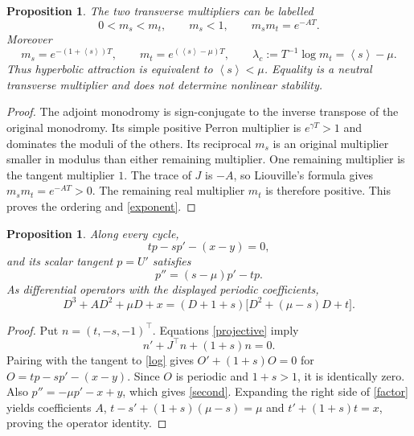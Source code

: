 \documentclass[11pt,a4paper]{article}
\newtheorem{proposition}[theorem]{Proposition}\newtheorem{corollary}[theorem]{Corollary}
\theoremstyle{remark}\newtheorem{remark}[theorem]{Remark}
\newcommand{\av}[1]{\left\langle #1\right\rangle}
\begin{document}
\begin{proposition}\label{multipliers}
The two transverse multipliers can be labelled
\[
 0<m_s<m_t,\qquad m_s<1,\qquad m_sm_t=e^{-AT}.
\]
Moreover
\begin{equation}\label{exponent}
 m_s=e^{-(1+\av{s})T},\qquad
 m_t=e^{(\av{s}-\mu)T},\qquad \lambda_c:=T^{-1}\log m_t=\av{s}-\mu.
\end{equation}
Thus hyperbolic attraction is equivalent to $\av{s}<\mu$. Equality is a neutral transverse multiplier and does not determine nonlinear stability.
\end{proposition}
\begin{proof}
The adjoint monodromy is sign-conjugate to the inverse transpose of the original monodromy. Its simple positive Perron multiplier is $e^{\gamma T}>1$ and dominates the moduli of the others. Its reciprocal $m_s$ is an original multiplier smaller in modulus than either remaining multiplier. One remaining multiplier is the tangent multiplier $1$. The trace of $J$ is $-A$, so Liouville's formula gives $m_sm_t=e^{-AT}>0$. The remaining real multiplier $m_t$ is therefore positive. This proves the ordering and \eqref{exponent}.
\end{proof}

\begin{proposition}\label{factorisation}
Along every cycle,
\begin{equation}\label{orthogonal}
 tp-sp'-(x-y)=0,
\end{equation}
and its scalar tangent $p=U'$ satisfies
\begin{equation}\label{second}
 p''=(s-\mu)p'-tp.
\end{equation}
As differential operators with the displayed periodic coefficients,
\begin{equation}\label{factor}
 D^3+AD^2+\mu D+x=(D+1+s)\bigl[D^2+(\mu-s)D+t\bigr].
\end{equation}
\end{proposition}
\begin{proof}
Put $n=(t,-s,-1)^\top$. Equations \eqref{projective} imply
\[
 n'+J^\top n+(1+s)n=0.
\]
Pairing with the tangent to \eqref{log} gives $O'+(1+s)O=0$ for $O=tp-sp'-(x-y)$. Since $O$ is periodic and $1+s>1$, it is identically zero. Also $p''=-\mu p'-x+y$, which gives \eqref{second}. Expanding the right side of \eqref{factor} yields coefficients $A$, $t-s'+(1+s)(\mu-s)=\mu$ and $t'+(1+s)t=x$, proving the operator identity.
\end{proof}
\end{document}
